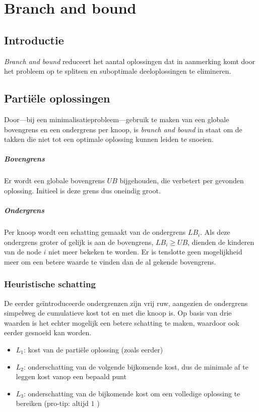 \chapter{Branch and bound}

\section{Introductie}
\emph{Branch and bound} reduceert het aantal oplossingen dat in aanmerking komt door het probleem op te splitsen en suboptimale deeloplossingen te elimineren. 

\section{Parti\"ele oplossingen}
Door---bij een minimalisatieprobleem---gebruik te maken van een globale bovengrens en een ondergrens per knoop, is \emph{branch and bound} in staat om de takken die niet tot een optimale oplossing kunnen leiden te snoeien.

\paragraph{Bovengrens} 
Er wordt een globale bovengrens $UB$ bijgehouden, die verbetert per gevonden oplossing. 
Initieel is deze grens dus oneindig groot.

\paragraph{Ondergrens}\label{paragraph:ondergrens}
Per knoop wordt een schatting gemaakt van de ondergrens $LB_i$.
Als deze ondergrens groter of gelijk is aan de bovengrens, $LB_i \geq UB$, dienden de kinderen van de node $i$ niet meer bekeken te worden.
Er is tenslotte geen mogelijkheid meer om een betere waarde te vinden dan de al gekende bovengrens.

\subsection{Heuristische schatting}
De eerder ge\"introduceerde ondergrenzen zijn vrij ruw, aangezien de ondergrens simpelweg de cumulatieve kost tot en met die knoop is. Op basis van drie waarden is het echter mogelijk een betere schatting te maken, waardoor ook eerder gesnoeid kan worden.

\begin{itemize}
    \item \textbf{$L_1$}: kost van de parti\"ele oplossing (zoals eerder)
    \item \textbf{$L_2$}: onderschatting van de volgende bijkomende kost, dus de minimale af te leggen kost vanop een bepaald punt
    \item \textbf{$L_3$}: onderschatting van de bijkomende kost om een volledige oplossing te bereiken (pro-tip: altijd $1$ \shrug)
\end{itemize}

